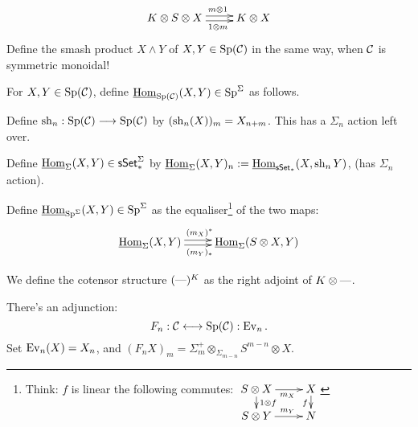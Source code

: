 \documentclass[11pt]{article}
\begin{document}
\begin{MichaelStableModelCats}
\begin{itemise}
\[\xymatrix{
K\otimes S\otimes X\ar@<.5ex>[r]^{\ \ m\otimes 1}\ar@<-.5ex>[r]_{\ \ 1\otimes m}&K\otimes X
}\]
Define the smash product $X\wedge Y$ of $X,Y\in\operatorname{Sp}(\mathcal{C})$ in the same way, when $\mathcal{C}$ is symmetric monoidal!
\item For $X,Y\in\operatorname{Sp}(\mathcal{C})$, define $\operatorname{\underline{Hom}}_{\operatorname{Sp}(\mathcal{C})}(X,Y)\in \operatorname{Sp}^\Sigma$ as follows.
\begin{itemise}
\item Define $\operatorname{sh}_n:\operatorname{Sp}(\mathcal{C})\longrightarrow\operatorname{Sp}(\mathcal{C})$ by $(\operatorname{sh}_n(X))_m=X_{n+m}$. This has a $\Sigma_n$ action left over.
\item Define $\operatorname{\underline{Hom}}_\Sigma(X,Y)\in\operatorname{{\mathsf{sSet}}}_*^\Sigma$ by $\operatorname{\underline{Hom}}_\Sigma(X,Y)_n:=\operatorname{\underline{Hom}}_{\operatorname{{\mathsf{sSet}}}_*}(X,\operatorname{sh}_nY)$, (has $\Sigma_n$ action).%
\item Define $\operatorname{\underline{Hom}}_{\operatorname{Sp}^\Sigma}(X,Y)\in\operatorname{Sp}^\Sigma$ as the equaliser\footnote{Think: $f$ is linear \Iff the following commutes: $\xymatrix@R=1em{
\ar[d]^{1\otimes f}S\otimes X\ar[r]_{\ \ m_X}&X\ar[d]_f\\
S\otimes Y\ar[r]^{\ \ m_Y}&N
}$} of the two maps:
\[\xymatrix{
\intHom_\Sigma(X,Y)\ar@<.5ex>[r]^{(m_X)^*\ \ }\ar@<-.5ex>[r]_{(m_Y)_*\ \ }&\intHom_\Sigma(S\otimes X,Y)
}\]
\end{itemise}
\item We define the cotensor structure $(\textup{---})^K$ as the right adjoint of $K\otimes\textup{---}$.
\item There's an adjunction:
\[F_n:\mathcal{C}\longleftrightarrow\operatorname{Sp}(\mathcal{C}):\operatorname{Ev}_n.\]
Set $\operatorname{Ev}_n(X)=X_n$, and $(F_nX)_m=\Sigma_m^+\otimes_{\Sigma_{m-n}}S^{m-n}\otimes X$. 
\end{itemise}

\end{MichaelStableModelCats}
\end{document}
